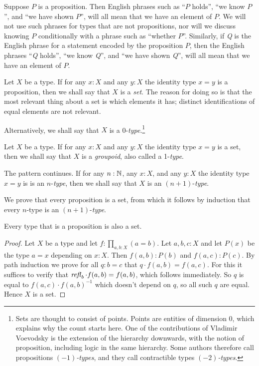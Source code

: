Suppose $P$ is a proposition.  Then English phrases such as ``$P$ holds'', ``we know $P$'', and ``we have shown $P$'', will all mean that we
have an element of $P$.  We will not use such phrases for types that are not propositions, nor will we discuss knowing $P$ conditionally with a
phrase such as ``whether $P$''.  Similarly, if {\em Q} is the English phrase for a statement encoded by the proposition $P$, then the English
phrases ``{\em Q} holds'', ``we know {\em Q}'', and ``we have shown {\em Q}'', will all mean that we have an element of $P$.

Let $X$ be a type.  If for any $x:X$ and any $y:X$ the identity 
type $x=y$ is a proposition, then we shall say that $X$ is a \emph{set}.
The reason for doing so is that the most relevant
thing about a set is which elements it has; distinct identifications
of equal elements are not relevant.

Alternatively, we shall say that $X$ is a 0-\emph{type}.\footnote{%
Sets are thought to consist of points. Points are entities of dimension 0, 
which explains why the count starts here.
One of the contributions of Vladimir Voevodsky is the extension of
the hierarchy downwards, with the notion of proposition,
including logic in the same hierarchy.
Some authors therefore call propositions \emph{$(-1)$-types}, and they call contractible types {\em $(-2)$-types}.} 

Let $X$ be a type.  If for any $x:X$ and any $y:X$ the identity type $x=y$ is a set, 
 then we shall say that $X$ is a \emph{groupoid}, also called a 1-\emph{type}.

The pattern continues.  If for any $n:\mathbb{N}$, any $x:X$, and any $y:X$ 
the identity type $x=y$ is is an $n$-\emph{type}, 
then we shall say that $X$ is an $(n+1)$-\emph{type}.

We prove that every proposition is a set, from which it follows
by induction that every $n$-type is an $(n+1)$-\emph{type}.

\begin{lemma}\label{lem:prop-is-set}
Every type that is a proposition is also a set.
\end{lemma}
\begin{proof}
Let $X$ be a type and let $f: \prod_{a,b:X} (a=b)$. Let $a,b,c : X$ and
let $P(x)$ be the type $a=x$ depending on $x:X$. Then
$f(a,b):P(b)$ and $f(a,c):P(c)$. By path induction we prove for
all $q:b=c$ that $q\cdot f(a,b) = f(a,c)$. For this it suffices to
verify that $\mathop{{\it refl}_{b}} \cdot f(a,b) = f(a,b)$, which follows immediately.
So $q$ is equal to $f(a,c)\cdot f(a,b)^{-1}$ which doesn't
depend on $q$, so all such $q$ are equal. Hence $X$ is a set.
\end{proof}

